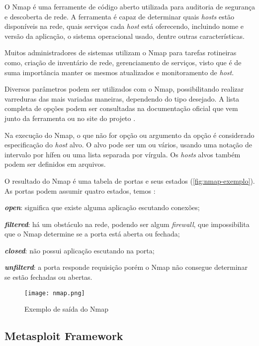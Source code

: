 O Nmap é uma ferramente de código aberto utilizada para auditoria de segurança e descoberta de rede. A ferramenta é capaz de determinar quais \textit{hosts} estão disponíveis na rede, quais serviços cada \textit{host} está oferecendo, incluindo nome e versão da aplicação, o sistema operacional usado, dentre outras características.  

Muitos administradores de sistemas utilizam o Nmap para tarefas rotineiras como, criação de inventário de rede, gerenciamento de serviços, visto que é de suma importância manter os mesmos atualizados e monitoramento de \textit{host}.

 Diversos parâmetros podem ser utilizados com o Nmap, possibilitando realizar varreduras das mais variadas maneiras, dependendo do tipo desejado. A lista completa de opções podem ser consultadas na documentação oficial que vem junto da ferramenta ou no site do projeto \cite{nmap}. 

 Na execução do Nmap, o que não for opção ou argumento da opção é considerado especificação do \textit{host} alvo. O alvo pode ser um ou vários, usando uma notação de intervalo por hífen ou uma lista separada por vírgula. Os \textit{hosts} alvos também podem ser definidos em arquivos.

O resultado do Nmap é uma tabela de portas e seus estados (\autoref{fig:nmap-exemplo}). As portas podem assumir quatro estados, temos \cite{nmap}: 
\begin{alineas}
\item \textbf{\textit{open}}: significa que existe alguma aplicação escutando conexões; 
\item \textbf{\textit{filtered}}: há um obstáculo na rede, podendo ser algum \textit{firewall}, que impossibilita que o Nmap determine se a porta está aberta ou fechada; 
\item \textbf{\textit{closed}}: não possui aplicação escutando na porta; 
\item \textbf{\textit{unfilterd}}: a porta responde requisição porém o Nmap não consegue determinar se estão fechadas ou abertas.
\end{alineas}

 \begin{figure}[htb]
  \centering
  \caption{Exemplo de saída do Nmap}
  \texttt{[image: nmap.png]}
  \label{fig:nmap-exemplo}
 \end{figure}

\subsection{Metasploit Framework} \label{sec:metasploit}

